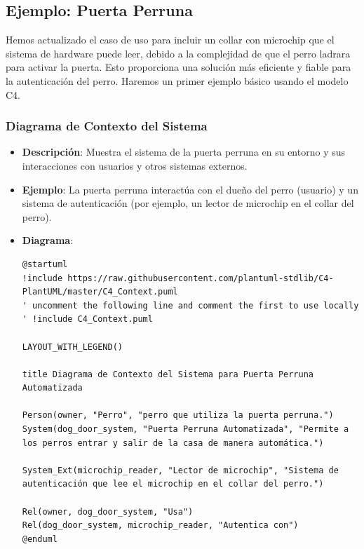 \newpage

\subsection{Ejemplo: Puerta Perruna}
 Hemos actualizado el caso de uso para incluir un collar con microchip que el sistema de hardware puede leer, debido a la complejidad de que el perro ladrara para activar la puerta. Esto proporciona una solución más eficiente y fiable para la autenticación del perro. Haremos un primer ejemplo básico usando el modelo C4.




\subsubsection{Diagrama de Contexto del Sistema}
\begin{itemize}
    \item \textbf{Descripción}: Muestra el sistema de la puerta perruna en su entorno y sus interacciones con usuarios y otros sistemas externos.
    \item \textbf{Ejemplo}: La puerta perruna interactúa con el dueño del perro (usuario) y un sistema de autenticación (por ejemplo, un lector de microchip en el collar del perro).
    \item \textbf{Diagrama}:
\begin{verbatim}
@startuml
!include https://raw.githubusercontent.com/plantuml-stdlib/C4-PlantUML/master/C4_Context.puml
' uncomment the following line and comment the first to use locally
' !include C4_Context.puml

LAYOUT_WITH_LEGEND()

title Diagrama de Contexto del Sistema para Puerta Perruna Automatizada

Person(owner, "Perro", "perro que utiliza la puerta perruna.")
System(dog_door_system, "Puerta Perruna Automatizada", "Permite a los perros entrar y salir de la casa de manera automática.")

System_Ext(microchip_reader, "Lector de microchip", "Sistema de autenticación que lee el microchip en el collar del perro.")

Rel(owner, dog_door_system, "Usa")
Rel(dog_door_system, microchip_reader, "Autentica con")
@enduml

\end{verbatim}
\end{itemize}

